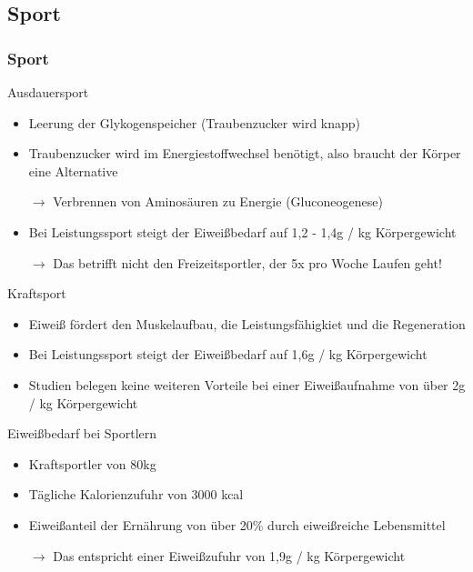 \documentclass[xcolor=dvipsnames]{beamer}
\begin{document}
    \subsection{Sport}
    \begin{frame}[allowframebreaks]
        \frametitle{Sport}

        \begin{block}{Ausdauersport}
            \begin{itemize}
                \setlength\itemsep{1em}
                \item Leerung der Glykogenspeicher (Traubenzucker wird knapp)
                \item Traubenzucker wird im Energiestoffwechsel benötigt, also braucht der Körper eine Alternative
                \item[$\rightarrow$] Verbrennen von Aminosäuren zu Energie (Gluconeogenese)
                \item Bei Leistungssport steigt der Eiweißbedarf auf 1,2 - 1,4g / kg Körpergewicht
                \item[$\rightarrow$] Das betrifft nicht den Freizeitsportler, der 5x pro Woche Laufen geht!
            \end{itemize}
        \end{block}

        \framebreak

        \begin{block}{Kraftsport}
            \begin{itemize}
                \setlength\itemsep{1em}
                \item Eiweiß fördert den Muskelaufbau, die Leistungsfähigkiet und die Regeneration
                \item Bei Leistungssport steigt der Eiweißbedarf auf 1,6g / kg Körpergewicht
                \item Studien belegen keine weiteren Vorteile bei einer Eiweißaufnahme von über 2g / kg Körpergewicht
            \end{itemize}
        \end{block}

        \framebreak

        \begin{block}{Eiweißbedarf bei Sportlern}
            \begin{itemize}
                \setlength\itemsep{1em}
                \item Kraftsportler von 80kg
                \item Tägliche Kalorienzufuhr von 3000 kcal
                \item Eiweißanteil der Ernährung von über 20\% durch eiweißreiche Lebensmittel
                \item[$\rightarrow$] Das entspricht einer Eiweißzufuhr von 1,9g / kg Körpergewicht
            \end{itemize}
        \end{block}


\end{frame}
\end{document}
